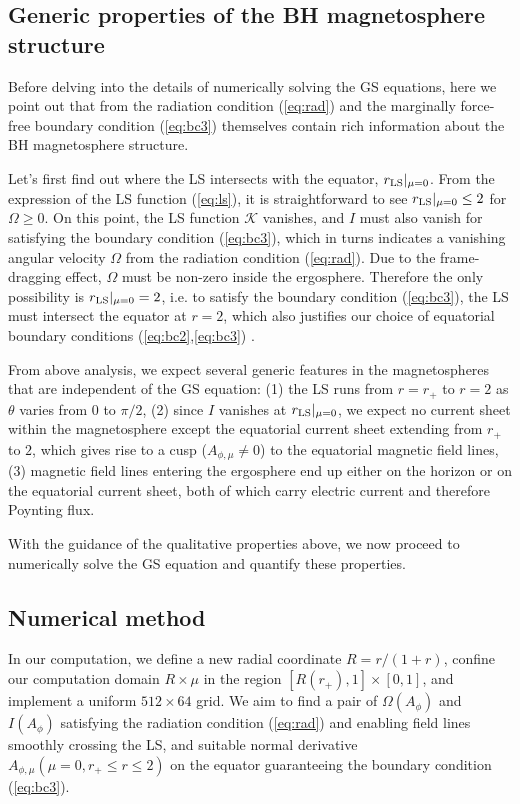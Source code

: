 \documentclass[aps,prd,reprint,nofootinbib, superscriptaddress]{revtex4-1}
\def\Am{A_{\phi,\mu}}
\begin{document}
\subsection{Generic properties of the BH magnetosphere structure}
\label{subsec:features}
Before delving into the details of numerically solving the GS equations,
here we point out that from the radiation condition (\ref{eq:rad}) and the marginally
force-free boundary condition (\ref{eq:bc3})
themselves contain rich information about the BH magnetosphere structure.

Let's first find out where the LS intersects with the equator, $r_{\rm LS}|_{\mu=0}$.
From the expression of the LS function (\ref{eq:ls}), it is straightforward to see $ r_{\rm LS}|_{\mu=0} \leq 2$ for $\Omega \geq 0$.
On this point,  the LS function $\mathcal K$ vanishes,
and $I$ must also vanish for satisfying the boundary condition (\ref{eq:bc3}),
which in turns indicates a vanishing angular velocity $\Omega$ from
the radiation condition (\ref{eq:rad}).  Due to the frame-dragging effect, $\Omega$
must be non-zero inside the ergosphere.  Therefore the only possibility is  $r_{\rm LS}|_{\mu=0} = 2$, i.e.
to satisfy the boundary condition (\ref{eq:bc3}), the LS must intersect the equator at $r=2$, which also
justifies our choice of equatorial boundary conditions (\ref{eq:bc2},\ref{eq:bc3}) .

From above analysis, we expect several generic features in the magnetospheres that are independent
of the GS equation:
(1) the LS runs from $r=r_+$ to $r=2$ as $\theta$ varies from $0$ to $\pi/2$,
(2) since $I$ vanishes at $r_{\rm LS}|_{\mu=0}$, we expect no current sheet within the magnetosphere except the equatorial current
sheet extending from $r_+$ to $2$, which gives rise to a cusp ($\Am \neq 0$) to the equatorial magnetic field lines,
(3) magnetic field lines entering the ergosphere end up either on the horizon or on the equatorial current sheet,
both of which carry electric current and therefore Poynting flux.

With the guidance of the qualitative properties above, we now proceed to numerically
solve the GS equation and quantify these properties.

\subsection{Numerical method}
\label{subsec:algorithm}

In our computation, we define a new radial coordinate $R=r/(1+r)$, confine our
computation domain $R\times \mu$ in the region $[R(r_+), 1]\times [0,1]$,
and implement a uniform $512\times 64$ grid.
We aim to find a pair of $\Omega(A_\phi)$ and $I(A_\phi)$ satisfying the radiation condition (\ref{eq:rad})
and enabling field lines smoothly crossing the LS,
and suitable normal derivative $\Am(\mu =0, r_+\leq r \leq 2)$ on the equator
guaranteeing the boundary condition (\ref{eq:bc3}).
\end{document}

